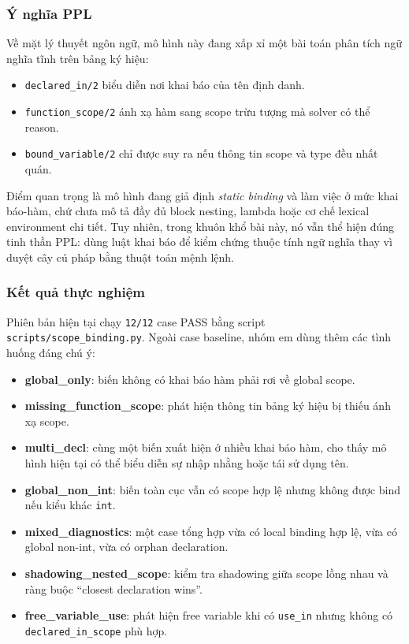 ﻿\documentclass[11pt,a4paper]{article}
\begin{document}
\subsubsection*{Ý nghĩa PPL}
Về mặt lý thuyết ngôn ngữ, mô hình này đang xấp xỉ một bài toán phân tích ngữ nghĩa tĩnh trên bảng ký hiệu:\
\begin{itemize}[leftmargin=1.5em]
  \item \texttt{declared\_in/2} biểu diễn nơi khai báo của tên định danh.
  \item \texttt{function\_scope/2} ánh xạ hàm sang scope trừu tượng mà solver có thể reason.
  \item \texttt{bound\_variable/2} chỉ được suy ra nếu thông tin scope và type đều nhất quán.
\end{itemize}
Điểm quan trọng là mô hình đang giả định \textit{static binding} và làm việc ở mức khai báo-hàm, chứ chưa mô tả đầy đủ block nesting, lambda hoặc cơ chế lexical environment chi tiết. Tuy nhiên, trong khuôn khổ bài này, nó vẫn thể hiện đúng tinh thần PPL: dùng luật khai báo để kiểm chứng thuộc tính ngữ nghĩa thay vì duyệt cây cú pháp bằng thuật toán mệnh lệnh.

\subsubsection*{Kết quả thực nghiệm}
 Phiên bản hiện tại chạy \texttt{12/12} case PASS bằng script \texttt{scripts/scope\_binding.py}. Ngoài case baseline, nhóm em dùng thêm các tình huống đáng chú ý:
\begin{itemize}[leftmargin=1.5em]
  \item \textbf{global\_only}: biến không có khai báo hàm phải rơi về global scope.
  \item \textbf{missing\_function\_scope}: phát hiện thông tin bảng ký hiệu bị thiếu ánh xạ scope.
  \item \textbf{multi\_decl}: cùng một biến xuất hiện ở nhiều khai báo hàm, cho thấy mô hình hiện tại có thể biểu diễn sự nhập nhằng hoặc tái sử dụng tên.
  \item \textbf{global\_non\_int}: biến toàn cục vẫn có scope hợp lệ nhưng không được bind nếu kiểu khác \texttt{int}.
  \item \textbf{mixed\_diagnostics}: một case tổng hợp vừa có local binding hợp lệ, vừa có global non-int, vừa có orphan declaration.
  \item \textbf{shadowing\_nested\_scope}: kiểm tra shadowing giữa scope lồng nhau và ràng buộc “closest declaration wins”.
  \item \textbf{free\_variable\_use}: phát hiện free variable khi có \texttt{use\_in} nhưng không có \texttt{declared\_in\_scope} phù hợp.
\end{itemize}
\end{document}
